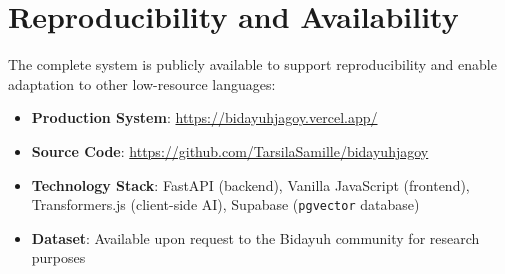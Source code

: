 \documentclass[12pt]{article}
\begin{document}



\section*{Reproducibility and Availability}
\noindent The complete system is publicly available to support reproducibility and enable adaptation to other low-resource languages:
\begin{itemize}
    \item \textbf{Production System}: \url{https://bidayuhjagoy.vercel.app/}
    \item \textbf{Source Code}: \url{https://github.com/TarsilaSamille/bidayuhjagoy}
    \item \textbf{Technology Stack}: FastAPI (backend), Vanilla JavaScript (frontend), Transformers.js (client-side AI), Supabase (\texttt{pgvector} database)
    \item \textbf{Dataset}: Available upon request to the Bidayuh community for research purposes
\end{itemize}

\appendix
\end{document}
